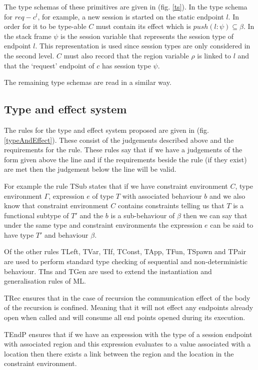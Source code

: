 The type schemas of these primitives are given in (fig. \ref{ts}). In the type schema for $req-c^l$, for example, a new session is started on the static endpoint $l$. In order for it to be type-able $C$ must contain its effect which is $push(l:\psi) \subseteq \beta$. In the stack frame $\psi$ is the session variable that represents the session type of endpoint $l$. This representation is used since session types are only considered in the second level. $C$ must also record that the region variable $\rho$ is linked to $l$ and that the `request' endpoint of $c$ has session type $\psi$. 

The remaining type schemas are read in a similar way. 


\subsection{Type and effect system} 

The rules for the type and effect system proposed are given in (fig. \ref{typeAndEffect}). These consist of the judgements described above and the requirements for the rule. These rules say that if we have a judgements of the form given above the line and if the requirements beside the rule (if they exist) are met then the judgement below the line will be valid.

For example the rule TSub states that if we have constraint environment $C$, type environment $\Gamma$, expression $e$ of type $T$ with associated behaviour $b$ and we also know that constraint environment $C$ contains constraints telling us that $T$ is a functional subtype of $T'$ and the $b$ is a sub-behaviour of $\beta$ then we can say that under the same type and constraint environments the expression $e$ can be said to have type $T'$ and behaviour $\beta$.

Of the other rules TLeft, TVar, TIf, TConst, TApp, TFun, TSpawn and TPair are used to perform standard type checking of sequential and non-deterministic behaviour. TIns and TGen are used to extend the instantiation and generalisation rules of ML. 

TRec ensures that in the case of recursion the communication effect of the body of the recursion is confined. Meaning that it will not effect any endpoints already open when called and will consume all end points opened during its execution. 

TEndP ensures that if we have an expression with the type of a session endpoint with associated region and this expression evaluates to a value associated with a location then there exists a link between the region and the location in the constraint environment. 

